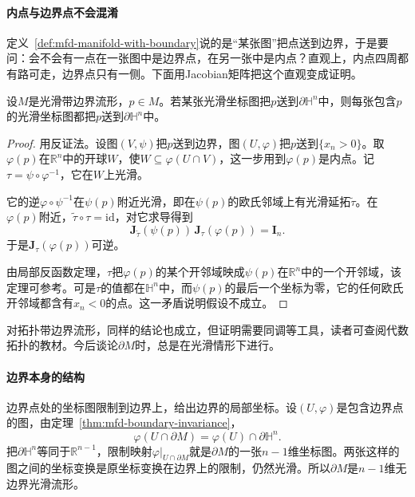 \paragraph{内点与边界点不会混淆}
定义~\ref{def:mfd-manifold-with-boundary}说的是“某张图”把点送到边界，于是要问：会不会有一点在一张图中是边界点，在另一张中是内点？直观上，内点四周都有路可走，边界点只有一侧。下面用Jacobian矩阵把这个直观变成证明。

\begin{theorem}[边界点的坐标无关性]
\label{thm:mfd-boundary-invariance}
设$M$是光滑带边界流形，$p\in M$。若某张光滑坐标图把$p$送到$\partial\mathbb H^n$中，则每张包含$p$的光滑坐标图都把$p$送到$\partial\mathbb H^n$中。
\end{theorem}

\begin{proof}
用反证法。设图$(V,\psi)$把$p$送到边界，图$(U,\varphi)$把$p$送到$\{x_n>0\}$。取$\varphi(p)$在$\mathbb R^n$中的开球$W$，使$W\subseteq\varphi(U\cap V)$，这一步用到$\varphi(p)$是内点。记$\tau=\psi\circ\varphi^{-1}$，它在$W$上光滑。

它的逆$\varphi\circ\psi^{-1}$在$\psi(p)$附近光滑，即在$\psi(p)$的欧氏邻域上有光滑延拓$\widetilde\tau$。在$\varphi(p)$附近，$\widetilde\tau\circ\tau=\mathrm{id}$，对它求导得到
\[
\bm J_{\widetilde\tau}(\psi(p))\,\bm J_\tau(\varphi(p))=\bm I_n .
\]
于是$\bm J_\tau(\varphi(p))$可逆。

由局部反函数定理，$\tau$把$\varphi(p)$的某个开邻域映成$\psi(p)$在$\mathbb R^n$中的一个开邻域，该定理可参考。可是$\tau$的值都在$\mathbb H^n$中，而$\psi(p)$的最后一个坐标为零，它的任何欧氏开邻域都含有$x_n<0$的点。这一矛盾说明假设不成立。
\end{proof}

对拓扑带边界流形，同样的结论也成立，但证明需要同调等工具，读者可查阅代数拓扑的教材。今后谈论$\partial M$时，总是在光滑情形下进行。

\paragraph{边界本身的结构}
边界点处的坐标图限制到边界上，给出边界的局部坐标。设$(U,\varphi)$是包含边界点的图，由定理~\ref{thm:mfd-boundary-invariance}，
\[
\varphi(U\cap\partial M)=\varphi(U)\cap\partial\mathbb H^n .
\]
把$\partial\mathbb H^n$等同于$\mathbb R^{n-1}$，限制映射$\varphi|_{U\cap\partial M}$就是$\partial M$的一张$n-1$维坐标图。两张这样的图之间的坐标变换是原坐标变换在边界上的限制，仍然光滑。所以$\partial M$是$n-1$维无边界光滑流形。

